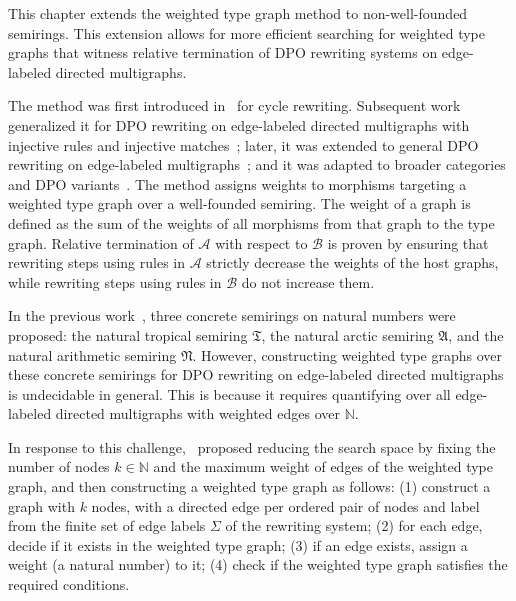 This chapter extends the weighted type graph method to non-well-founded semirings. This extension allows for more efficient searching for weighted type graphs that witness relative termination of DPO rewriting systems on edge-labeled directed multigraphs.

The method was first introduced in~\cite{zantema2014termination} for cycle rewriting. Subsequent work generalized it for DPO rewriting on edge-labeled directed multigraphs with injective rules and injective matches~\cite{bruggink2014termination}; later, it was extended to general DPO rewriting on edge-labeled multigraphs~\cite{bruggink2015proving}; and it was adapted to broader categories and DPO variants~\cite{endrullis2024generalized_icgt}.
The method assigns weights to morphisms targeting a weighted type graph over a well-founded semiring. The weight of a graph is defined
 as the sum of the weights of all morphisms from that graph to the type graph. Relative termination of $\mathcal{A}$ with respect to $\mathcal{B}$ is proven by ensuring that rewriting steps using rules in \( \mathcal{A} \) strictly decrease the weights of the host graphs, while rewriting steps using rules in \( \mathcal{B} \) do not increase them.
    
    In the previous work~\cite{zantema2014termination,bruggink2014termination,bruggink2015proving}, three concrete semirings on natural numbers were proposed: the natural tropical semiring $\mathfrak{T}$, the natural arctic semiring $\mathfrak{A}$, and the natural arithmetic semiring $\mathfrak{N}$.
    However, constructing weighted type graphs over these concrete semirings for DPO rewriting on edge-labeled directed multigraphs is undecidable in general. This is because it requires quantifying over all edge-labeled directed multigraphs with weighted edges over $\mathbb{N}$. 

    In response to this challenge,~\cite{zantema2014termination,bruggink2014termination,bruggink2015proving} proposed reducing the search space by fixing the number of nodes \( k \in \mathbb{N} \) and the maximum weight of edges of the weighted type graph, and then constructing a weighted type graph as follows: (1) construct a graph with \( k \) nodes, with a directed edge per ordered pair of nodes and label from the finite set of edge labels $\Sigma$ of the rewriting system; (2) for each edge, decide if it exists in the weighted type graph; (3) if an edge exists, assign a weight (a natural number) to it; (4) check if the weighted type graph satisfies the required conditions.
    
